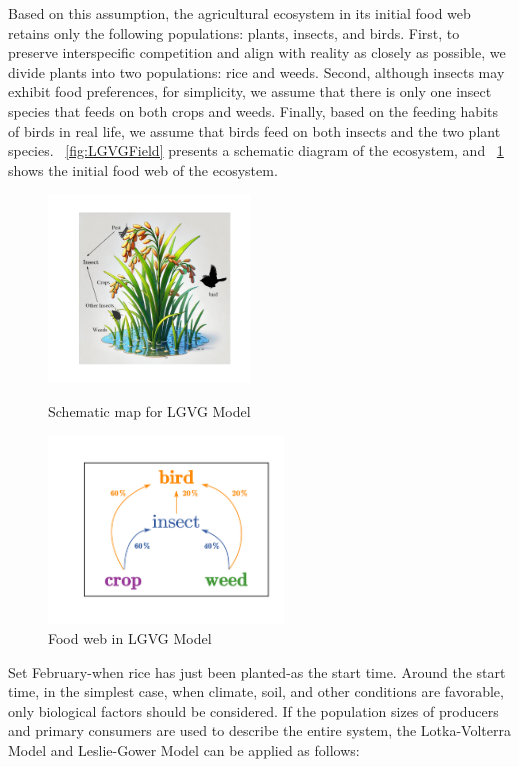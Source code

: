 \documentclass{HZNUMCM}
\begin{document}
      Based on this assumption, the agricultural ecosystem in its initial food web retains only the following populations: plants, insects, and birds. 
      First, to preserve interspecific competition and align with reality as closely as possible, we divide plants into two populations: rice and weeds. 
      Second, although insects may exhibit food preferences, for simplicity, we assume that there is only one insect species that feeds on both crops and weeds. 
      Finally, based on the feeding habits of birds in real life, we assume that birds feed on both insects and the two plant species. 
      \figurename~\ref{fig:LGVGField} presents a schematic diagram of the ecosystem, and \figurename~\ref{fig:SimpleFoodWeb} shows the initial food web of the ecosystem.
      \begin{figure}[H]
        \centering
          \begin{minipage}[b]{0.45\linewidth}
              \centering
              \includegraphics[height=5cm, keepaspectratio]{images/LGVGField.pdf} %
              \caption{Schematic map for LGVG Model}
              \label{fig:LGVGField}
          \end{minipage}
        \hspace{0.05\linewidth}
          \begin{minipage}[b]{0.45\linewidth}
              \centering
              \includegraphics[height=5cm, keepaspectratio]{images/SimpleFoodWeb.pdf}
              \caption{Food web in LGVG Model}
              \label{fig:SimpleFoodWeb}
          \end{minipage}
        \end{figure}
      Set February-when rice has just been planted-as the start time.
      Around the start time, in the simplest case, when climate, soil, and other conditions are favorable, 
      only biological factors should be considered.
      If the population sizes of producers and primary consumers are used to describe the entire system, 
      the Lotka-Volterra Model\cite{wangersky1978lotka} and Leslie-Gower Model\cite{GUO20142850} can be applied as follows:
\end{document}
